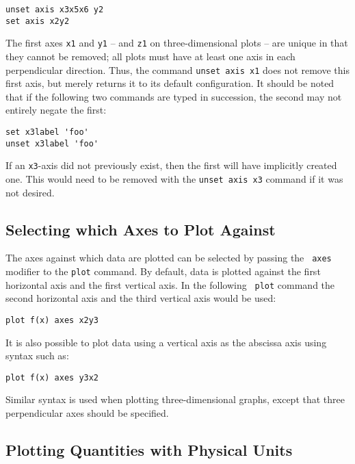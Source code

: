 \begin{verbatim}
unset axis x3x5x6 y2
set axis x2y2
\end{verbatim}

\noindent The first axes {\tt x1} and {\tt y1} -- and {\tt z1} on
three-dimensional plots -- are unique in that they cannot be removed; all plots
must have at least one axis in each perpendicular direction.  Thus, the command
{\tt unset axis x1} does not remove this first axis, but merely returns it to
its default configuration.  It should be noted that if the following two
commands are typed in succession, the second may not entirely negate the first:

\begin{verbatim}
set x3label 'foo'
unset x3label 'foo'
\end{verbatim}

\noindent If an {\tt x3}-axis did not previously exist, then the first will
have implicitly created one. This would need to be removed with the {\tt unset
axis x3} command if it was not desired.

\subsection{Selecting which Axes to Plot Against}

The axes against which data are plotted can be selected by passing the {\tt
axes} modifier to the {\tt plot} command. By default, data is plotted against
the first horizontal axis and the first vertical axis. In the following {\tt
plot} command the second horizontal axis and the third vertical axis would be
used:
\begin{verbatim}
plot f(x) axes x2y3
\end{verbatim}
It is also possible to plot data using a vertical axis as the abscissa axis
using syntax such as:
\begin{verbatim}
plot f(x) axes y3x2
\end{verbatim}
Similar syntax is used when plotting three-dimensional graphs, except that
three perpendicular axes should be specified.

\subsection{Plotting Quantities with Physical Units}
\label{sec:set_axisunitstyle}

